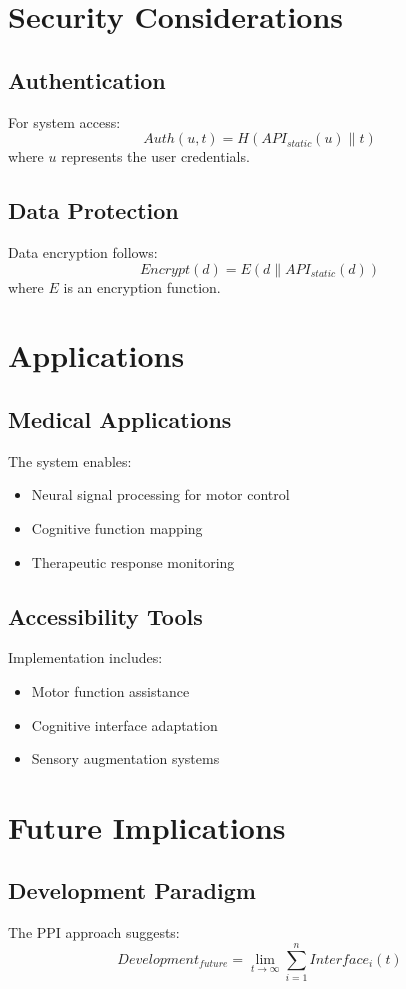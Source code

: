 \documentclass[12pt]{article}
\begin{document}
\section{Security Considerations}

\subsection{Authentication}
For system access:
\[Auth(u, t) = H(API_{static}(u) \parallel t)\]
where $u$ represents the user credentials.

\subsection{Data Protection}
Data encryption follows:
\[Encrypt(d) = E(d \parallel API_{static}(d))\]
where $E$ is an encryption function.

\section{Applications}

\subsection{Medical Applications}
The system enables:
\begin{itemize}
    \item Neural signal processing for motor control
    \item Cognitive function mapping
    \item Therapeutic response monitoring
\end{itemize}

\subsection{Accessibility Tools}
Implementation includes:
\begin{itemize}
    \item Motor function assistance
    \item Cognitive interface adaptation
    \item Sensory augmentation systems
\end{itemize}

\section{Future Implications}

\subsection{Development Paradigm}
The PPI approach suggests:
\begin{equation}
Development_{future} = \lim_{t \to \infty} \sum_{i=1}^n Interface_i(t)
\end{equation}
\end{document}
